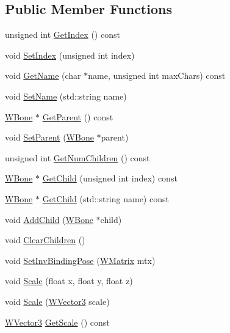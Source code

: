 \subsection*{Public Member Functions}
\begin{DoxyCompactItemize}
\item 
unsigned int \hyperlink{class_w_bone_ac34df13d37b9ef9fa49581de312ea802}{Get\+Index} () const 
\item 
void \hyperlink{class_w_bone_a816d5c7fa5f33d1cfff653c20be0008b}{Set\+Index} (unsigned int index)
\item 
void \hyperlink{class_w_bone_af24fc7f8abe358165a02189e97d909f8}{Get\+Name} (char $\ast$name, unsigned int max\+Chars) const 
\item 
void \hyperlink{class_w_bone_ab1409e5a42fe007b9571686f6716b91e}{Set\+Name} (std\+::string name)
\item 
\hyperlink{class_w_bone}{W\+Bone} $\ast$ \hyperlink{class_w_bone_acafa3e5893e744113492fb2525cb812b}{Get\+Parent} () const 
\item 
void \hyperlink{class_w_bone_acb93dbbf3dcbb65411d3dd55d3b5044b}{Set\+Parent} (\hyperlink{class_w_bone}{W\+Bone} $\ast$parent)
\item 
unsigned int \hyperlink{class_w_bone_abf92c1789862985bda1819eb24cf1566}{Get\+Num\+Children} () const 
\item 
\hyperlink{class_w_bone}{W\+Bone} $\ast$ \hyperlink{class_w_bone_ad3f4731db0aa3779765c9b1896589399}{Get\+Child} (unsigned int index) const 
\item 
\hyperlink{class_w_bone}{W\+Bone} $\ast$ \hyperlink{class_w_bone_a0566019906b04267d0bc1ed97b2a7aa6}{Get\+Child} (std\+::string name) const 
\item 
void \hyperlink{class_w_bone_ad946c1721952194f897bb507b3a957f4}{Add\+Child} (\hyperlink{class_w_bone}{W\+Bone} $\ast$child)
\item 
void \hyperlink{class_w_bone_ab50eaca75d126aed8e673e56b9af83c1}{Clear\+Children} ()
\item 
void \hyperlink{class_w_bone_aeff2f20a5dfc558411c008bd37827330}{Set\+Inv\+Binding\+Pose} (\hyperlink{class_w_matrix}{W\+Matrix} mtx)
\item 
void \hyperlink{class_w_bone_a7dc15ea6b51d156256c712fd492e7255}{Scale} (float x, float y, float z)
\item 
void \hyperlink{class_w_bone_a596a55c9ff01c1bbcd252fdddcd904e8}{Scale} (\hyperlink{class_w_vector3}{W\+Vector3} scale)
\item 
\hyperlink{class_w_vector3}{W\+Vector3} \hyperlink{class_w_bone_a2990b236df6401d6da86ecf100b9d9a3}{Get\+Scale} () const 

\end{DoxyCompactItemize}
